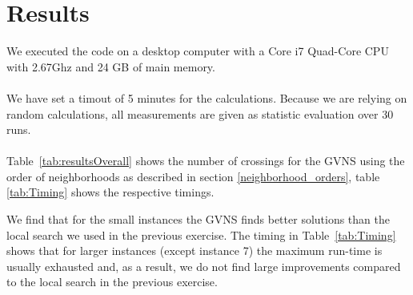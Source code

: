\documentclass{scrartcl}
\begin{document}
\section{Results}

We executed the code on a desktop computer with a Core i7 Quad-Core
CPU with 2.67Ghz and 24 GB of main memory. 

\paragraph{}
We have set a timout of 5 minutes for the calculations.
Because we are relying on random calculations, all measurements are given as 
statistic evaluation over 30 runs.


\paragraph{}
Table~\ref{tab:resultsOverall} shows the number of crossings
for the GVNS using the order of neighborhoods as described in section \ref{neighborhood_orders}, 
table  \ref{tab:Timing} shows the respective timings.

We find that for the small instances the GVNS finds better
solutions than the local search we used in the previous
exercise. The timing in Table~\ref{tab:Timing} shows that for
larger instances (except instance 7) the maximum run-time is usually exhausted and, as a
result, we do not find large improvements compared to the local search
in the previous exercise.


%
%
%
\end{document}
